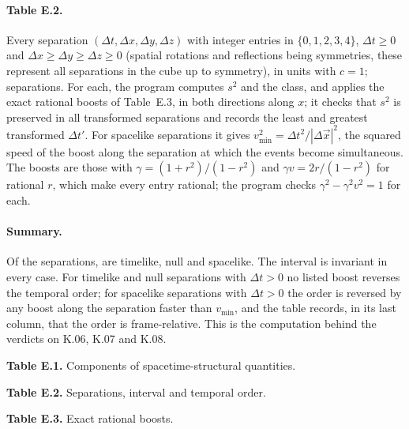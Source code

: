 \paragraph{Table E.2.} Every separation $(\Delta t, \Delta x, \Delta y, \Delta z)$ with integer entries in $\{0,1,2,3,4\}$, $\Delta t \geq 0$ and $\Delta x \geq \Delta y \geq \Delta z \geq 0$ (spatial rotations and reflections being symmetries, these represent all separations in the cube up to symmetry), in units with $c = 1$; \vvNErows{} separations. For each, the program computes $s^2$ and the class, and applies the \vvNEboosts{} exact rational boosts of Table~E.3, in both directions along $x$; it checks that $s^2$ is preserved in all \vvNEboostchecks{} transformed separations and records the least and greatest transformed $\Delta t'$. For spacelike separations it gives $v^2_{\min} = \Delta t^2/|\Delta\vec x|^2$, the squared speed of the boost along the separation at which the events become simultaneous. The boosts are those with $\gamma = (1+r^2)/(1-r^2)$ and $\gamma v = 2r/(1-r^2)$ for rational $r$, which make every entry rational; the program checks $\gamma^2 - \gamma^2 v^2 = 1$ for each.

\paragraph{Summary.} Of the \vvNErows{} separations, \vvNEtime{} are timelike, \vvNEnull{} null and \vvNEspace{} spacelike. The interval is invariant in every case. For timelike and null separations with $\Delta t > 0$ no listed boost reverses the temporal order; for spacelike separations with $\Delta t > 0$ the order is reversed by any boost along the separation faster than $v_{\min}$, and the table records, in its last column, that the order is frame-relative. This is the computation behind the verdicts on K.06, K.07 and K.08.

\begin{center}\textbf{Table E.1.} Components of spacetime-structural quantities.\end{center}


\begin{center}\textbf{Table E.2.} Separations, interval and temporal order.\end{center}


\begin{center}\textbf{Table E.3.} Exact rational boosts.\end{center}


